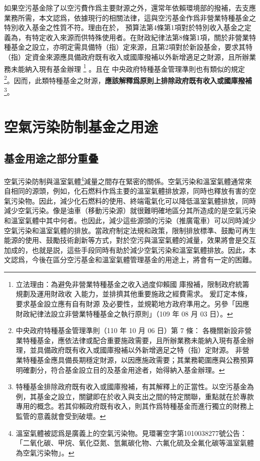 \documentclass[12pt,a4paper]{article}
\begin{document}
如果空污基金除了以空污費作爲主要財源之外，還常年依賴環境部的撥補，去支應業務所需，本文認爲，依據現行的相關法律，這與空污基金作爲非營業特種基金之特別收入基金之性質不符。理由在於，
預算法第4條第1項對於特別收入基金之定義為，有特定收入來源而供特殊使用者。在財政紀律法第8條第1項，關於非營業特種基金之設立，亦明定需具備特（指）定來源，且第2項對於新設基金，要求其特（指）定資金來源應具備政府既有收入或國庫撥補以外新增適足之財源，且所辦業務未能納入現有基金辦理
\footnote{立法理由：為避免非營業特種基金之收入過度仰賴國
庫撥補，限制政府統籌規劃及運用財政收
入能力，並排擠其他重要施政之經費需求。
爰訂定本條，要求基金設立應有自有財源
及必要性，並規範地方政府準用之。另參「因應財政紀律法設立非營業特種基金之執行原則」（109 年 08 月 03 日）。}
。且在	中央政府特種基金管理準則也有類似的規定
\footnote{	中央政府特種基金管理準則（110 年 10 月 06 日）第 7 條：
各機關新設非營業特種基金，應依法律或配合重要施政需要，且所辦業務未能納入現有基金辦理，並具備政府既有收入或國庫撥補以外新增適足之特（指）定財源。
非營業特種基金應具備長期穩定財源，以因應施政需要；其業務範圍應與公務預算明確劃分，符合基金設立目的及基金用途者，始得納入基金辦理。}。因而，此類特種基金之財源，\textbf{應該解釋爲原則上排除政府既有收入或國庫撥補}\footnote{特種基金排除政府既有收入或國庫撥補，有其解釋上的正當性。以空污基金為例，其基金之設立，關鍵即在於收入與支出之間的特定關聯，重點就在於專款專用的概念。若其仰賴政府既有收入，則其作爲特種基金而進行獨立的財務上監管的意義就會受到破壞。
}。

\section{空氣污染防制基金之用途}



\subsection{基金用途之部分重叠}

空氣污染防制與溫室氣體\footnote{溫室氣體被認爲是廣義上的空氣污染物。見環署空字第1010038277號公告：「二氧化碳、甲烷、氧化亞氮、氫氟碳化物、六氟化硫及全氟化碳等溫室氣體為空氣污染物」。}減量之間存在緊密的關係。空氣污染和溫室氣體通常來自相同的源頭，例如，化石燃料作爲主要的溫室氣體排放源，同時也釋放有害的空氣污染物。因此，減少化石燃料的使用、終端電氣化可以降低溫室氣體排放，同時減少空氣污染。像是油車（移動污染源）就很難明確地區分其所造成的是空氣污染和溫室氣體中其中何者。也因此，減少這些源頭的污染（推廣電車）可以同時減少空氣污染和溫室氣體的排放。當政府制定法規和政策，限制排放標準、鼓勵可再生能源的使用、鼓勵技術創新等方式，對於空污與溫室氣體的減量，效果將會是交互加成的，也就是説，這些手段同時有助於減少空氣污染和溫室氣體排放。因此，本文認爲，今後在區分空污基金和溫室氣體管理基金的用途上，將會有一定的困難。
\end{document}
